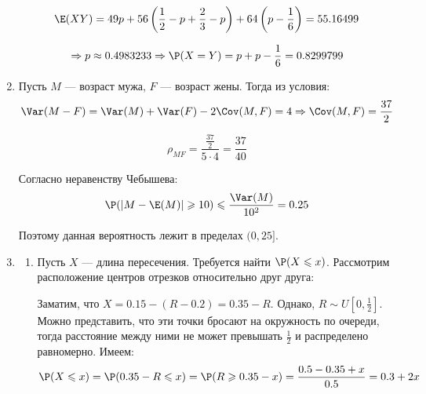 \begin{enumerate}
\[
\E(XY) = 49p+56\left(\frac{1}{2} - p + \frac{2}{3}-p\right) + 64\left(p-\frac{1}{6}\right) = 55.16499
\]

\[
\Rightarrow p \approx 0.4983233 \Rightarrow \P(X=Y) = p + p-\frac{1}{6} = 0.8299799
\]



\item

Пусть $M$ — возраст мужа, $F$ — возраст жены. Тогда из условия:
\[
\Var(M-F) = \Var(M) + \Var(F) - 2\Cov(M, F) = 4 \Rightarrow \Cov(M, F) = \frac{37}{2}
\]

\[
\rho_{MF} = \frac{\frac{37}{2}}{5\cdot4} = \frac{37}{40}
\]


Согласно неравенству Чебышева:
\[
\P(|M-\E(M)|\geqslant10) \leqslant\frac{\Var(M)}{10^2} = 0.25
\]

Поэтому данная вероятность лежит в пределах $(0, 25]$.

\renewcommand{\labelenumii}{(\alph{enumii})}
\item
\begin{enumerate}
\item Пусть $X$ — длина пересечения. Требуется найти $\P(X\leqslant x)$. Рассмотрим расположение центров отрезков относительно друг друга:

\begin{center}
\end{center}

Заматим, что $X = 0.15-(R-0.2) = 0.35-R$. Однако, $R \sim U\left[0, \frac{1}{2}\right]$. Можно представить, что эти точки бросают на окружность по очереди, тогда расстояние между ними не может превышать $\frac{1}{2}$ и распределено равномерно. Имеем:
\[
\P(X \leqslant x) = \P(0.35-R\leqslant x) = \P(R \geqslant 0.35-x) = \frac{0.5-0.35+x}{0.5} = 0.3+2x
\]


\end{enumerate}
\end{enumerate}
